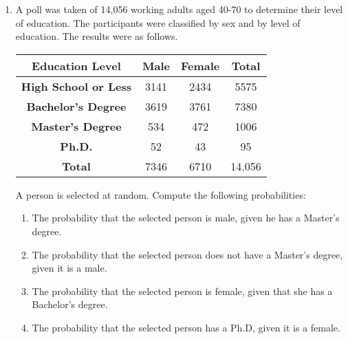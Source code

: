 \begin{enumerate}
\item A poll was taken of 14,056 working adults aged 40-70 to determine their level of
education. The participants were classified by sex and by level of education. The results
were as follows.
\begin{center}
\begin{tabular}{c|cc|c}
\textbf{Education Level}     &  \textbf{Male} &  \textbf{Female} &  \textbf{Total} \\ \hline
\textbf{High School or Less} & 3141  &2434     &  5575  \\ 
\textbf{Bachelor's Degree}   & 3619  &3761     &  7380  \\
\textbf{Master's Degree}     & 534   &472      &  1006  \\
\textbf{Ph.D.}               & 52    &43       &  95    \\ \hline
\textbf{Total} 							& 7346  &6710     & 14,056 \\ 
\end{tabular}
\end{center}
A person is selected at random. Compute the following probabilities:
\begin{enumerate}
\item The probability that the selected person is male, given he has a Master's degree. 
\item The probability that the selected person does not have a Master's degree, given it is a male. 
\item The probability that the selected person is female, given that she has a Bachelor's degree. 
\item The probability that the selected person has a Ph.D, given it is a female. 
\end{enumerate}
\end{enumerate}